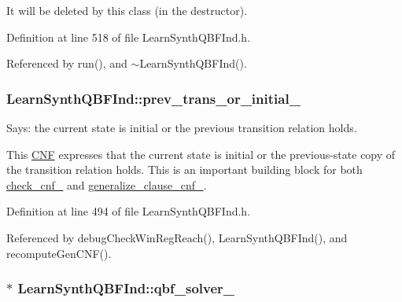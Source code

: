 It will be deleted by this class (in the destructor). 

Definition at line 518 of file Learn\-Synth\-Q\-B\-F\-Ind.\-h.



Referenced by run(), and $\sim$\-Learn\-Synth\-Q\-B\-F\-Ind().

\hypertarget{classLearnSynthQBFInd_ad99eafb7ee9134115f9fbe986e5eb0c5}{
\subsubsection[{prev\-\_\-trans\-\_\-or\-\_\-initial\-\_\-}]{ Learn\-Synth\-Q\-B\-F\-Ind\-::prev\-\_\-trans\-\_\-or\-\_\-initial\-\_\-\hspace{0.3cm}{\ttfamily [protected]}}}\label{classLearnSynthQBFInd_ad99eafb7ee9134115f9fbe986e5eb0c5}


Says\-: the current state is initial or the previous transition relation holds. 

This \hyperlink{classCNF}{C\-N\-F} expresses that the current state is initial or the previous-\/state copy of the transition relation holds. This is an important building block for both \hyperlink{classLearnSynthQBFInd_ac90a4574da82c96888db219291368554}{check\-\_\-cnf\-\_\-} and \hyperlink{classLearnSynthQBFInd_ad61b112cfcc60506f7b21c9ea9267b37}{generalize\-\_\-clause\-\_\-cnf\-\_\-}. 

Definition at line 494 of file Learn\-Synth\-Q\-B\-F\-Ind.\-h.



Referenced by debug\-Check\-Win\-Reg\-Reach(), Learn\-Synth\-Q\-B\-F\-Ind(), and recompute\-Gen\-C\-N\-F().

\hypertarget{classLearnSynthQBFInd_ada2a2526b313b2ba4bb9d717fb63362d}{
\subsubsection[{qbf\-\_\-solver\-\_\-}]{$\ast$ Learn\-Synth\-Q\-B\-F\-Ind\-::qbf\-\_\-solver\-\_\-\hspace{0.3cm}{\ttfamily [protected]}}}\label{classLearnSynthQBFInd_ada2a2526b313b2ba4bb9d717fb63362d}


